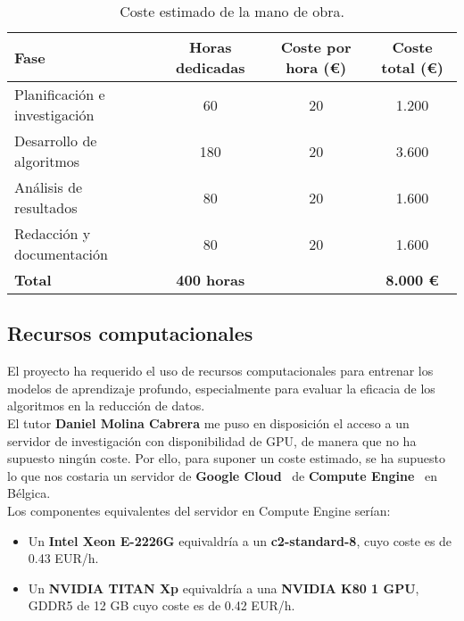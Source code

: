 \begin{table}[htp]\label{tab:mano-de-obra}
    \centering
    \begin{adjustbox}{width=\linewidth}
        \begin{tabular}{|l|c|c|c|}
            \hline
            \textbf{Fase} & \textbf{Horas dedicadas} & \textbf{Coste por hora (€)} & \textbf{Coste total (€)} \\ \hline
            Planificación e investigación & 60 & 20 & 1.200 \\
            Desarrollo de algoritmos & 180 & 20 & 3.600 \\
            Análisis de resultados & 80 & 20 & 1.600 \\
            Redacción y documentación & 80 & 20 & 1.600 \\ \hline
            \textbf{Total} & \textbf{400 horas} & & \textbf{8.000 €} \\ \hline
        \end{tabular}
    \end{adjustbox}
    \caption{Coste estimado de la mano de obra.}
\end{table}


\subsection{Recursos computacionales}\label{subsec:recursos-computacionales}
El proyecto ha requerido el uso de recursos computacionales para entrenar los modelos de aprendizaje profundo,
especialmente para evaluar la eficacia de los algoritmos en la reducción de datos. \\[6pt]

El tutor \textbf{Daniel Molina Cabrera} me puso en disposición el acceso a un servidor de investigación con
disponibilidad de GPU, de manera que no ha supuesto ningún coste.
Por ello, para suponer un coste estimado, se ha supuesto lo que nos costaria un servidor de
\textbf{Google Cloud}~\cite{} de \textbf{Compute Engine}~\cite{} en Bélgica. \\[6pt]

Los componentes equivalentes del servidor en Compute Engine serían:
\begin{itemize}
    \item Un \textbf{Intel Xeon E-2226G} equivaldría a un \textbf{c2-standard-8}, cuyo coste es de 0.43 EUR/h.
    \item Un \textbf{NVIDIA TITAN Xp} equivaldría a una \textbf{NVIDIA K80 1 GPU}, GDDR5 de 12 GB cuyo coste es de 0.42
EUR/h.
\end{itemize}

